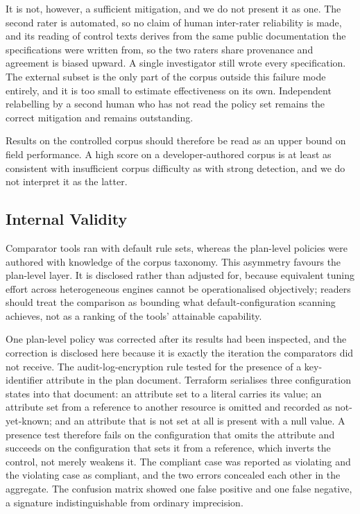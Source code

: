 \documentclass[journal]{IEEEtran}
\begin{document}
It is not, however, a sufficient mitigation, and we do not present it as one. The
second rater is automated, so no claim of human inter-rater reliability is made,
and its reading of control texts derives from the same public documentation the
specifications were written from, so the two raters share provenance and
agreement is biased upward. A single investigator still wrote every specification.
The external subset is the only part of the corpus outside this failure mode
entirely, and it is too small to estimate effectiveness on its own. Independent
relabelling by a second human who has not read the policy set remains the correct
mitigation and remains outstanding.

Results on the controlled corpus should therefore be read as an upper bound on
field performance. A high score on a developer-authored corpus is at least as
consistent with insufficient corpus difficulty as with strong detection, and we do
not interpret it as the latter.

\subsection{Internal Validity}
\label{sec:internal}
Comparator tools ran with default rule sets, whereas the plan-level policies were
authored with knowledge of the corpus taxonomy. This asymmetry favours the
plan-level layer. It is disclosed rather than adjusted for, because equivalent
tuning effort across heterogeneous engines cannot be operationalised objectively;
readers should treat the comparison as bounding what default-configuration
scanning achieves, not as a ranking of the tools' attainable capability.

One plan-level policy was corrected after its results had been inspected, and the
correction is disclosed here because it is exactly the iteration the comparators
did not receive. The audit-log-encryption rule tested for the presence of a
key-identifier attribute in the plan document. Terraform serialises three
configuration states into that document: an attribute set to a literal carries its
value; an attribute set from a reference to another resource is omitted and
recorded as not-yet-known; and an attribute that is not set at all is present with
a null value. A presence test therefore fails on the configuration that omits the
attribute and succeeds on the configuration that sets it from a reference, which
inverts the control, not merely weakens it. The compliant case was reported as
violating and the violating case as compliant, and the two errors concealed each
other in the aggregate. The confusion matrix showed one false positive and one
false negative, a signature indistinguishable from ordinary imprecision.
\end{document}

